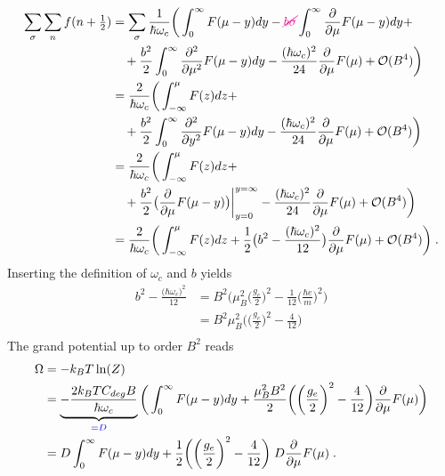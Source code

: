 \begin{align*}
\sum_{\sigma} \sum_{n} f(n+\tfrac12) &=\sum_{\sigma}
\frac{1}{\hbar \omega_{c}} 
\bigg(
\int_{0}^{\infty} F(\mu-y)dy - {\color{magenta} \cancel{b \sigma}} \int_{0}^{\infty} \frac{\partial }{\partial \mu}F(\mu-y)dy +\\
&\quad + \frac{b^{2}}{2}\int_{0}^{\infty} \frac{\partial^{2} }{\partial \mu^{2}}F(\mu-y)dy
 -\frac{(\hbar \omega_{c})^{2}}{24}\frac{\partial }{\partial \mu} 
 F(\mu)   
 +{\cal O}(B^{4})\bigg)\\
 &=
\frac{2}{\hbar \omega_{c}} 
\bigg(
\int_{-\infty}^{\mu} F(z)dz  +\\
&\quad + \frac{b^{2}}{2}\int_{0}^{\infty} \frac{\partial^{2} }{\partial y^{2}}F(\mu-y)dy
 -\frac{(\hbar \omega_{c})^{2}}{24}\frac{\partial }{\partial \mu}  F(\mu)   
 +{\cal O}(B^{4})\bigg)\\
  &=
\frac{2}{\hbar \omega_{c}} 
\bigg(
\int_{-\infty}^{\mu} F(z)dz  +\\
&\quad + \frac{b^{2}}{2}\big(\frac{\partial }{\partial \mu}F(\mu-y)\big)\bigg|_{y=0}^{y=\infty}
 -\frac{(\hbar \omega_{c})^{2}}{24}\frac{\partial }{\partial \mu}  F(\mu)   
 +{\cal O}(B^{4})\bigg)\\
   &=
\frac{2}{\hbar \omega_{c}} 
\bigg(
\int_{-\infty}^{\mu} F(z)dz 
 +\frac{1}{2}\big( b^{2}-\frac{(\hbar \omega_{c})^{2}}{12}\big)
 \frac{\partial }{\partial \mu}F(\mu)
 +{\cal O}(B^{4})\bigg)\;.
\end{align*}
%
Inserting the definition of $\omega_{c}$ and $b$
yields
%
\begin{align*}
b^{2} -\frac{\big(\hbar \omega_{c}\big)^{2}}{12} 
&=B^{2}\bigg( \mu_{B}^{2}\bigg(\frac{g_{e}}{2}\bigg)^{2} - \frac{1}{12}\bigg(\frac{\hbar e}{m}\bigg)^{2} \bigg)\\
&=B^{2}\mu_{B}^{2}\bigg( \bigg(\frac{g_{e}}{2}\bigg)^{2} - \frac{4}{12} \bigg)\\
\end{align*}
%
The grand potential up to order $B^{2}$ reads 
%
\begin{align*}
\Omega &= -k_{B}T \ln(Z)\\
&=\underbrace{-
\frac{2 k_{B} T C_{deg}B}{\hbar \omega_{c}} 
}_{\color{blue} = D}
\bigg(
\int_{0}^{\infty} F(\mu-y)dy  
 +\frac{\mu_{B}^{2}B^{2}}{2}\bigg(  \bigg(\frac{g_{e}}{2}\bigg)^{2} - \frac{4}{12}  \bigg)
 \frac{\partial }{\partial \mu}F(\mu)\bigg)\\
 &=
D  \int_{0}^{\infty} F(\mu-y)dy  
 +\frac{1}{2}\bigg(  \bigg(\frac{g_{e}}{2}\bigg)^{2} - \frac{4}{12}  \bigg)
\;D \frac{\partial }{\partial \mu} F(\mu)\;.
\end{align*}
